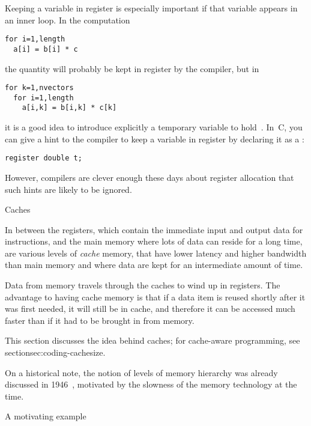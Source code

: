 Keeping a variable in register is especially important if that
variable appears in an inner loop. In the computation
\begin{verbatim}
for i=1,length
  a[i] = b[i] * c
\end{verbatim}
the quantity  will probably be kept in register by the compiler,
but in 
\begin{verbatim}
for k=1,nvectors
  for i=1,length
    a[i,k] = b[i,k] * c[k]
\end{verbatim}
it is a good idea to introduce explicitly a temporary variable to
hold~. In~C, you can give a hint to the compiler
to keep a variable in register by declaring it as a :
\begin{verbatim}
register double t;
\end{verbatim}
However, compilers are clever enough these days about register allocation
that such hints are likely to be ignored.


 {Caches}
\label{sec:cache}

In between the registers, which contain the immediate input and output
data for instructions, and the main memory where lots of data can reside for a
long time, are various levels of \emph{cache} memory, that have
lower latency and higher bandwidth than main memory and where data are
kept for an intermediate amount of time.  

Data from
memory travels through the caches to wind up in registers. The
advantage to having cache memory is that if a data item is reused
shortly after it was first needed, it will still be in cache, and
therefore it can be accessed much faster than if it had to be
brought in from memory.

This section discusses the idea behind caches;
for cache-aware programming, see section{sec:coding-cachesize}.

On a historical note, the notion of levels of memory hierarchy was
already discussed in 1946~\cite{Burks:discussion}, motivated
by the slowness of the memory technology at the time.

 {A motivating example}

